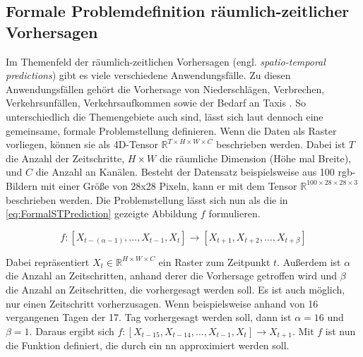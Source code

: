 \subsection{Formale Problemdefinition räumlich-zeitlicher Vorhersagen}
\label{sec:STPredictions}
Im Themenfeld der räumlich-zeitlichen Vorhersagen (engl. \emph{spatio-temporal predictions}) gibt es viele verschiedene Anwendungsfälle.
Zu diesen Anwendungsfällen gehört die Vorhersage von Niederschlägen, Verbrechen, Verkehrsunfällen, Verkehrsaufkommen sowie der Bedarf an Taxis \cite{ConvLSTM,CrimeConvLSTM,CrimeSTResNet,HeteroConvLSTM,TrafficVolumeGraphDCRNN,STResNetOriginal}.
So unterschiedlich die Themengebiete auch sind, lässt sich laut \cite{DLTraff} dennoch eine gemeinsame, formale Problemstellung definieren.
Wenn die Daten als Raster vorliegen, können sie als 4D-Tensor $\mathbb{R}^{T \times H \times W \times C}$ beschrieben werden.
Dabei ist $T$ die Anzahl der Zeitschritte, $H \times W$ die räumliche Dimension (Höhe mal Breite), und $C$ die Anzahl an Kanälen.
Besteht der Datensatz beispielsweise aus 100 \acrshort{rgb}-Bildern mit einer Größe von 28x28 Pixeln, kann er mit dem Tensor $\mathbb{R}^{100 \times 28 \times 28 \times 3}$ beschrieben werden.
Die Problemstellung lässt sich nun als die in \autoref{eq:FormalSTPrediction} gezeigte Abbildung $f$ formulieren.

\begin{equation}
    f: [X_{t-(\alpha-1)}, \dots, X_{t-1}, X_t] \to [X_{t+1}, X_{t+2}, \dots, X_{t+\beta}]
\label{eq:FormalSTPrediction}
\end{equation}

Dabei repräsentiert $X_t \in \mathbb{R}^{H \times W \times C}$ ein Raster zum Zeitpunkt $t$.
Außerdem ist $\alpha$ die Anzahl an Zeitschritten, anhand derer die Vorhersage getroffen wird und $\beta$ die Anzahl an Zeitschritten, die vorhergesagt werden soll.
Es ist auch möglich, nur einen Zeitschritt vorherzusagen.
Wenn beispielsweise anhand von 16 vergangenen Tagen der 17. Tag vorhergesagt werden soll, dann ist $\alpha = 16$ und $\beta = 1$.
Daraus ergibt sich $f: [X_{t-15}, X_{t-14}, \dots, X_{t-1}, X_t] \to X_{t+1}$.
Mit $f$ ist nun die Funktion definiert, die durch ein \acrshort{nn} approximiert werden soll.


